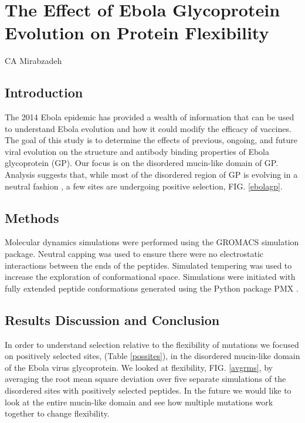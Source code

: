 \chapter{The Effect of Ebola Glycoprotein Evolution on Protein Flexibility}
CA Mirabzadeh


\section{Introduction}

The 2014 Ebola epidemic has provided a wealth of information that can be used to understand Ebola evolution and how it could modify the efficacy of vaccines. The goal of this study is to determine the effects of previous, ongoing, and future viral evolution on the structure and antibody binding properties of Ebola glycoprotein (GP). Our focus is on the disordered mucin-like domain of GP. Analysis suggests that, while most of the disordered region of GP is evolving in a neutral fashion \cite{Olabode2015, Li2014}, a few sites are undergoing positive selection, FIG. \ref{ebolagp}.

\section{Methods}
Molecular dynamics simulations were performed using the GROMACS \cite{Berendsen1995} simulation package. Neutral capping was used to ensure there were no electrostatic interactions between the ends of the peptides. Simulated tempering was used to increase the exploration of conformational space. Simulations were initiated with fully extended peptide conformations generated using the Python package PMX  \cite{Gapsys2015}.

\section{Results Discussion and Conclusion}

In order to understand selection relative to the flexibility of mutations we focused on positively selected sites, (Table \ref{possites}), in the disordered mucin-like domain of the Ebola virus glycoprotein.  We looked at flexibility, FIG. \ref{avgrms}, by averaging the root mean square deviation over five separate simulations of the disordered sites with positively selected peptides. In the future we would like to look at the entire mucin-like domain and see how multiple mutations work together to change flexibility.


